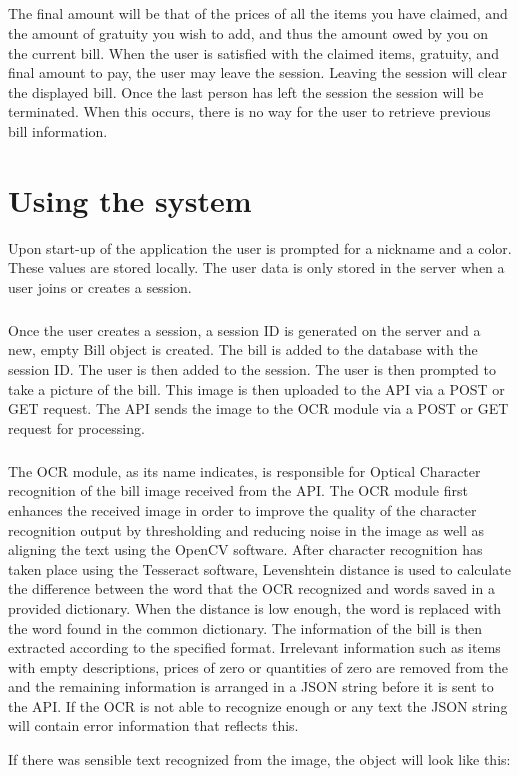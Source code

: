 \documentclass[12pt,a4paper]{article}
\begin{document}
\subparagraph{}
The final amount will be that of the prices of all the items you have claimed, and the amount of gratuity you wish to add, and thus the amount owed by you on the current bill. When the user is satisfied with the claimed items, gratuity, and final amount to pay, the user may leave the session. Leaving the session will clear the displayed bill. Once the last person has left the session the session will be terminated. When this occurs, there is no way for the user to retrieve previous bill information.

\section{Using the system}
Upon start-up of the application the user is prompted for a nickname and a color. These values are stored locally. The user data is only stored in the server when a user joins or creates a session.  
\subparagraph{}
Once the user creates a session, a session ID is generated on the server and a new, empty Bill object is created. The bill is added to the database with the session ID. The user is then added to the session. The user is then prompted to take a picture of the bill. This image is then uploaded to the API via a POST or GET request. The API sends the image to the OCR module via a POST or GET request for processing. 
\subparagraph{}
The OCR module, as its name indicates, is responsible for Optical Character recognition of the bill image received from the API. The OCR module first enhances the received image in order to improve the quality of the character recognition output by thresholding and reducing noise in the image as well as aligning the text using the OpenCV software. After character recognition has taken place using the Tesseract software, Levenshtein distance is used to calculate the difference between the word that the OCR recognized and words saved in a provided dictionary. When the distance is low enough, the word is replaced with the word found in the common dictionary. The information of the bill is then extracted according to the specified format. Irrelevant information such as items with empty descriptions, prices of zero or quantities of zero are removed from the and the remaining information is arranged in a JSON string before it is sent to the API. If the OCR is not able to recognize enough or any text the JSON string will contain error information that reflects this. 
\hspace{1cm}

If there was sensible text recognized from the image, the object will look like this:
\end{document}
